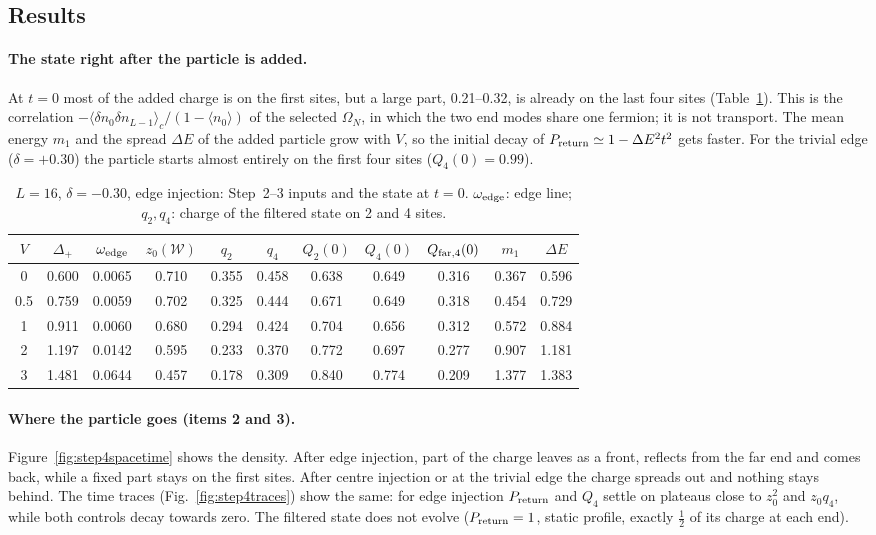 \documentclass[11pt,a4paper]{article}
\begin{document}
\subsection{Results}

\paragraph{The state right after the particle is added.} At $t=0$ most of the added charge is on the first sites, but a large part, 0.21--0.32, is already on the last four sites (Table~\ref{tab:step4t0}). This is the correlation $-\langle\delta n_0\delta n_{L-1}\rangle_c/(1-\langle n_0\rangle)$ of the selected $\Omega_N$, in which the two end modes share one fermion; it is not transport. The mean energy $m_1$ and the spread $\Delta E$ of the added particle grow with $V$, so the initial decay of $P_{\rm return}\simeq1-\Delta E^2t^2$ gets faster. For the trivial edge ($\delta=+0.30$) the particle starts almost entirely on the first four sites ($Q_4(0)=0.99$).

\begin{table}[htbp]
\centering\small
\begin{tabular}{@{}c cccccc cccc@{}}
\toprule
$V$ & $\Delta_+$ & $\omega_{\rm edge}$ & $z_0(\mathcal{W})$ & $q_2$ & $q_4$ & $Q_2(0)$ & $Q_4(0)$ & $Q_{\rm far,4}(0)$ & $m_1$ & $\Delta E$\\
\midrule
0   & 0.600 & 0.0065 & 0.710 & 0.355 & 0.458 & 0.638 & 0.649 & 0.316 & 0.367 & 0.596\\
0.5 & 0.759 & 0.0059 & 0.702 & 0.325 & 0.444 & 0.671 & 0.649 & 0.318 & 0.454 & 0.729\\
1   & 0.911 & 0.0060 & 0.680 & 0.294 & 0.424 & 0.704 & 0.656 & 0.312 & 0.572 & 0.884\\
2   & 1.197 & 0.0142 & 0.595 & 0.233 & 0.370 & 0.772 & 0.697 & 0.277 & 0.907 & 1.181\\
3   & 1.481 & 0.0644 & 0.457 & 0.178 & 0.309 & 0.840 & 0.774 & 0.209 & 1.377 & 1.383\\
\bottomrule
\end{tabular}
\caption{$L=16$, $\delta=-0.30$, edge injection: Step~2--3 inputs and the state at $t=0$. $\omega_{\rm edge}$: edge line; $q_2,q_4$: charge of the filtered state on 2 and 4 sites.}
\label{tab:step4t0}
\end{table}

\paragraph{Where the particle goes (items 2 and 3).} Figure~\ref{fig:step4spacetime} shows the density. After edge injection, part of the charge leaves as a front, reflects from the far end and comes back, while a fixed part stays on the first sites. After centre injection or at the trivial edge the charge spreads out and nothing stays behind. The time traces (Fig.~\ref{fig:step4traces}) show the same: for edge injection $P_{\rm return}$ and $Q_4$ settle on plateaus close to $z_0^2$ and $z_0q_4$, while both controls decay towards zero. The filtered state does not evolve ($P_{\rm return}=1$, static profile, exactly $\tfrac12$ of its charge at each end).
\end{document}

